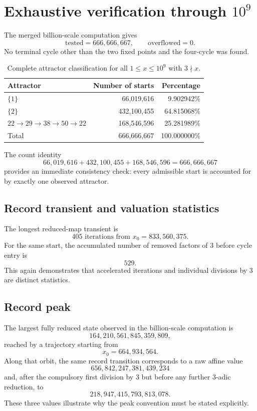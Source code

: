 \documentclass[11pt]{article}
\begin{document}
\section{Exhaustive verification through $10^9$}
The merged billion-scale computation gives
\begin{equation}
\boxed{\text{tested}=666,666,667,\qquad\text{overflowed}=0.}
\end{equation}
No terminal cycle other than the two fixed points and the four-cycle was found.

\begin{table}[ht]
\centering
\caption{Complete attractor classification for all $1\le x\le10^9$ with $3\nmid x$.}
\label{tab:1e9}
\begin{tabular}{lrr}
\toprule
Attractor & Number of starts & Percentage\\
\midrule
$\{1\}$ & 66,019,616 & 9.902942\%\\
$\{2\}$ & 432,100,455 & 64.815068\%\\
$22\to29\to38\to50\to22$ & 168,546,596 & 25.281989\%\\
\midrule
Total & 666,666,667 & 100.000000\%\\
\bottomrule
\end{tabular}
\end{table}

The count identity
\[
66,019,616+432,100,455+168,546,596=666,666,667
\]
provides an immediate consistency check: every admissible start is accounted for by exactly one observed attractor.

\subsection{Record transient and valuation statistics}
The longest reduced-map transient is
\begin{equation}
\boxed{405\text{ iterations from }x_0=833,560,375.}
\end{equation}
For the same start, the accumulated number of removed factors of $3$ before cycle entry is
\begin{equation}
\boxed{529.}
\end{equation}
This again demonstrates that accelerated iterations and individual divisions by $3$ are distinct statistics.

\subsection{Record peak}
The largest fully reduced state observed in the billion-scale computation is
\begin{equation}
\boxed{164,210,561,845,359,809,}
\end{equation}
reached by a trajectory starting from
\begin{equation}
\boxed{x_0=664,934,564.}
\end{equation}
Along that orbit, the same record transition corresponds to a raw affine value
\[
656,842,247,381,439,234
\]
and, after the compulsory first division by $3$ but before any further $3$-adic reduction, to
\[
218,947,415,793,813,078.
\]
These three values illustrate why the peak convention must be stated explicitly.
\end{document}
